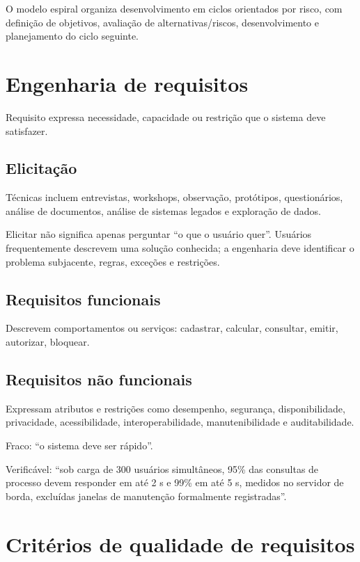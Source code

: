 O modelo espiral organiza desenvolvimento em ciclos orientados por risco, com definição de objetivos, avaliação de alternativas/riscos, desenvolvimento e planejamento do ciclo seguinte.

\section{Engenharia de requisitos}

Requisito expressa necessidade, capacidade ou restrição que o sistema deve satisfazer.

\subsection{Elicitação}

Técnicas incluem entrevistas, workshops, observação, protótipos, questionários, análise de documentos, análise de sistemas legados e exploração de dados.

Elicitar não significa apenas perguntar ``o que o usuário quer''. Usuários frequentemente descrevem uma solução conhecida; a engenharia deve identificar o problema subjacente, regras, exceções e restrições.

\subsection{Requisitos funcionais}

Descrevem comportamentos ou serviços: cadastrar, calcular, consultar, emitir, autorizar, bloquear.

\subsection{Requisitos não funcionais}

Expressam atributos e restrições como desempenho, segurança, disponibilidade, privacidade, acessibilidade, interoperabilidade, manutenibilidade e auditabilidade.

\begin{exemplo}
Fraco: ``o sistema deve ser rápido''.

Verificável: ``sob carga de 300 usuários simultâneos, 95\% das consultas de processo devem responder em até 2 s e 99\% em até 5 s, medidos no servidor de borda, excluídas janelas de manutenção formalmente registradas''.
\end{exemplo}

\section{Critérios de qualidade de requisitos}


